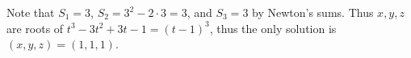 Note that $S_1=3$, $S_2=3^2-2\cdot 3=3$, and $S_3=3$ by Newton's sums.
Thus $x,y,z$ are roots of $t^3-3t^2+3t-1=(t-1)^3$, thus the only solution
is $(x,y,z)=(1,1,1)$.
